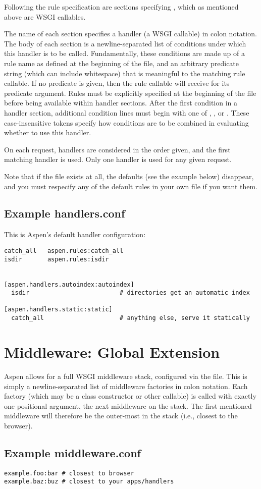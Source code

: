 Following the rule specification are sections specifying , which
as mentioned above are WSGI callables.

The name of each section specifies a handler (a WSGI callable) in colon
notation. The body of each section is a newline-separated list of conditions
under which this handler is to be called. Fundamentally, these conditions are
made up of a rule name as defined at the beginning of the file, and an arbitrary
predicate string (which can include whitespace) that is meaningful to the
matching rule callable. If no predicate is given, then the rule callable will
receive  for its predicate argument. Rules must be explicitly
specified at the beginning of the file before being available within handler
sections. After the first condition in a handler section, additional condition
lines must begin with one of , , or . These
case-insensitive tokens specify how conditions are to be combined in evaluating
whether to use this handler.

On each request, handlers are considered in the order given, and the first
matching handler is used. Only one handler is used for any given request.

Note that if the file  exists at all, the defaults
(see the example below) disappear, and you must respecify any of the default
rules in your own file if you want them.


\subsection{Example handlers.conf}
This is Aspen's default handler configuration:

\begin{verbatim}
catch_all   aspen.rules:catch_all
isdir       aspen.rules:isdir


[aspen.handlers.autoindex:autoindex]
  isdir                         # directories get an automatic index

[aspen.handlers.static:static]
  catch_all                     # anything else, serve it statically
\end{verbatim}


\section{Middleware: Global Extension \label{middleware}}

Aspen allows for a full WSGI middleware stack, configured via the
 file. This is simply a newline-separated list of
middleware factories in colon notation. Each factory (which may be a class
constructor or other callable) is called with exactly one positional argument,
the next middleware on the stack. The first-mentioned middleware will therefore
be the outer-most in the stack (i.e., closest to the browser).


\subsection{Example middleware.conf}

\begin{verbatim}
example.foo:bar # closest to browser
example.baz:buz # closest to your apps/handlers
\end{verbatim}